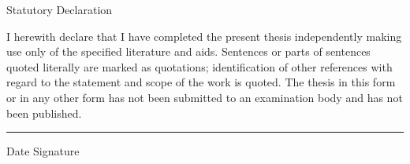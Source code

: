 \thispagestyle{plain}

\begin{center}
	\LARGE

	\vspace{3ex} Statutory Declaration
\end{center}

\normalsize

I herewith declare that I have completed the present thesis independently making use only of
the specified literature and aids. Sentences or parts of sentences quoted literally are marked as
quotations; identification of other references with regard to the statement and scope of the
work is quoted. The thesis in this form or in any other form has not been submitted to an
examination body and has not been published.

\vspace*{2cm}

\begin{flushright}
	\begin{minipage}[r]{10cm}
		\hrule\vspace*{1ex}\hspace{0.3cm} Date \hspace{1.5cm} Signature\\
		\vspace{1cm}
	\end{minipage}
\end{flushright}
\clearpage